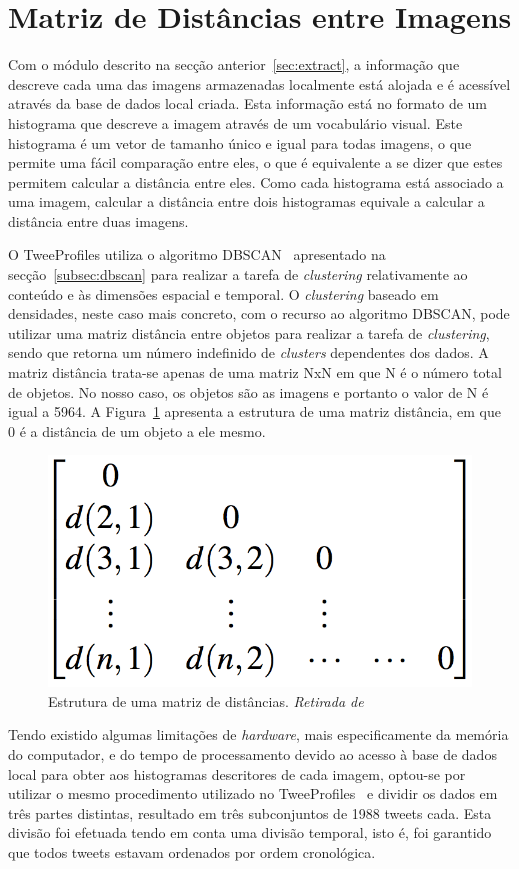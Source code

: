 \section{Matriz de Distâncias entre Imagens}\label{sec:matdist}

Com o módulo descrito na secção anterior~\ref{sec:extract}, a informação que descreve cada uma das imagens armazenadas localmente está alojada e é acessível através da base de dados local criada. Esta informação está no formato de um histograma que descreve a imagem através de um vocabulário visual. Este histograma é um vetor de tamanho único e igual para todas imagens, o que permite uma fácil comparação entre eles, o que é equivalente a se dizer que estes permitem calcular a distância entre eles. Como cada histograma está associado a uma imagem, calcular a distância entre dois histogramas equivale a calcular a distância entre duas imagens.

O TweeProfiles utiliza o algoritmo DBSCAN~\cite{Han2006} apresentado na secção~\ref{subsec:dbscan} para realizar a tarefa de \textit{clustering} relativamente ao conteúdo e às dimensões espacial e temporal. O \textit{clustering} baseado em densidades, neste caso mais concreto, com o recurso ao algoritmo DBSCAN, pode utilizar uma matriz distância entre objetos para realizar a tarefa de \textit{clustering}, sendo que retorna um número indefinido de \textit{clusters} dependentes dos dados. A matriz distância trata-se apenas de uma matriz NxN em que N é o número total de objetos. No nosso caso, os objetos são as imagens e portanto o valor de N é igual a 5964. A Figura~\ref{fig:matriz} apresenta a estrutura de uma matriz distância, em que 0 é a distância de um objeto a ele mesmo.

\begin{figure}[h]
\centering
\includegraphics[width=0.3\linewidth]{./figures/matrizdist}
\caption{Estrutura de uma matriz de distâncias. \textit{Retirada de}~\cite{Han2006}}
\label{fig:matriz}
\end{figure}

Tendo existido algumas limitações de \textit{hardware}, mais especificamente da memória do computador, e do tempo de processamento devido ao acesso à base de dados local para obter aos histogramas descritores de cada imagem, optou-se por utilizar o mesmo procedimento utilizado no TweeProfiles~\cite{Cunha2013} e dividir os dados em três partes distintas, resultado em três subconjuntos de 1988 tweets cada. Esta divisão foi efetuada tendo em conta uma divisão temporal, isto é, foi garantido que todos tweets estavam ordenados por ordem cronológica.
 
